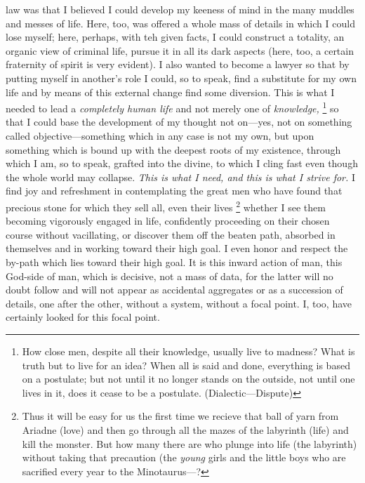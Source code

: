   law was that I believed I could develop my keeness of mind in
  the many muddles and messes of life.
Here, too, was offered a whole mass of details in which I
  could lose myself; here, perhaps, with teh given facts, I could
  construct a totality, an organic view of criminal life, pursue
  it in all its dark aspects (here, too, a certain fraternity of
  spirit is very evident).
I also wanted to become a lawyer so that by putting myself in
  another's role I could, so to speak, find a substitute for my
  own life and by means of this external change find some
  diversion.
This is what I needed to lead a \textit{completely human life}
  and not merely one of \textit{knowledge,}
  \footnote{
  How close men, despite all their knowledge, usually live to
      madness?
  What is truth but to live for an idea?
  When all is said and done, everything is based on a
      postulate; but not until it no longer stands on the outside,
      not until one lives in it, does it cease to be a postulate.
  (Dialectic---Dispute)
  }
  so that I could base the development of my thought not
  on---yes, not on something called objective---something which in
  any case is not my own, but upon something which is bound up
  with the deepest roots of my existence, through which I am, so
  to speak, grafted into the divine, to which I cling fast even
  though the whole world may collapse.
\textit{This is what I need, and this is what I strive for.}
I find joy and refreshment in contemplating the great men who
  have found that precious stone for which they sell all, even
  their lives
  \footnote{
  Thus it will be easy for us the first time we recieve that
      ball of yarn from Ariadne (love) and then go through all the
      mazes of the labyrinth (life) and kill the monster.
  But how many there are who plunge into life (the labyrinth)
      without taking that precaution (the \textit{young} girls and the
      little boys who are sacrified every year to the Minotaurus---?
  }
  whether I see them becoming vigorously engaged in life,
  confidently proceeding on their chosen course without vacillating,
  or discover them off the beaten path, absorbed in themselves and
  in working toward their high goal.
I even honor and respect the by-path which lies toward their
  high goal.
It is this inward action of man, this God-side of man, which
  is decisive, not a mass of data, for the latter will no doubt
  follow and will not appear as accidental aggregates or as a
  succession of details, one after the other, without a system,
  without a focal point.
I, too, have certainly looked for this focal point.
